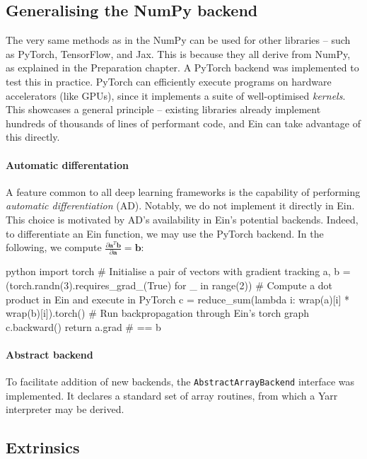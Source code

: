 \subsection{Generalising the NumPy backend}

The very same methods as in the NumPy can be used for other libraries -- such as PyTorch, TensorFlow, and Jax. This is because they all derive from NumPy, as explained in the Preparation chapter. A PyTorch backend was implemented to test this in practice. PyTorch can efficiently execute programs on hardware accelerators (like GPUs), since it implements a suite of well-optimised \textit{kernels}. This showcases a general principle -- existing libraries already implement hundreds of thousands of lines of performant code, and Ein can take advantage of this directly.

\paragraph{Automatic differentation} A feature common to all deep learning frameworks is the capability of performing \textit{automatic differentiation} (AD). Notably, we do not implement it directly in Ein. This choice is motivated by AD's availability in Ein's potential backends. Indeed, to differentiate an Ein function, we may use the PyTorch backend. In the following, we compute $\frac{\partial \mathbf{a}^T \mathbf{b}}{\partial \mathbf{a}} = \mathbf{b}$:
\begin{center}
\begin{cminted}{python}
import torch
# Initialise a pair of vectors with gradient tracking
a, b = (torch.randn(3).requires_grad_(True) for _ in range(2))
# Compute a dot product in Ein and execute in PyTorch
c = reduce_sum(lambda i: wrap(a)[i] * wrap(b)[i]).torch()
# Run backpropagation through Ein's torch graph
c.backward()
return a.grad  # == b
\end{cminted}
\end{center}

\paragraph{Abstract backend} To facilitate addition of new backends, the \texttt{AbstractArrayBackend} interface was implemented. It declares a standard set of array routines, from which a Yarr interpreter may be derived.

\subsection{Extrinsics}


